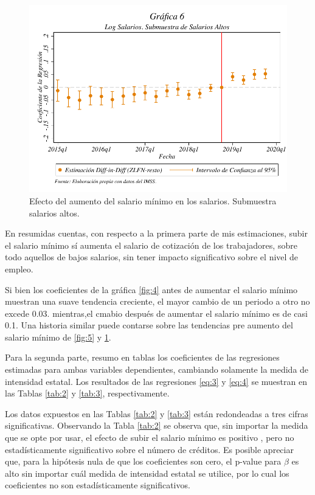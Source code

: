 \begin{figure}[H]
\includegraphics[width=\textwidth]{Figures/_LogSalarios_SalariosAltos.pdf}\caption{Efecto del aumento del salario mínimo en los salarios. Submuestra salarios altos.}
\label{fig:6}
\end{figure}

En resumidas cuentas, con respecto a la primera parte de mis estimaciones, subir el salario mínimo sí aumenta el salario de cotización de los trabajadores, sobre todo aquellos de bajos salarios, sin tener impacto significativo sobre el nivel de empleo. 

Si bien los coeficientes de la gráfica \ref{fig:4} antes de aumentar el salario mínimo muestran una suave tendencia creciente, el mayor cambio de un periodo a otro no excede 0.03. mientras,el cmabio después de aumentar el salario mínimo es de casi 0.1. Una historia similar puede contarse sobre las tendencias pre aumento del salario mínimo de \ref{fig:5} y \ref{fig:6}.

Para la segunda parte, resumo en tablas los coeficientes de las regresiones estimadas para ambas variables dependientes, cambiando solamente la medida de intensidad estatal. Los resultados de las regresiones \ref{eq:3} y \ref{eq:4} se muestran en las Tablas \ref{tab:2} y \ref{tab:3}, respectivamente.


Los datos expuestos en las Tablas \ref{tab:2} y \ref{tab:3} están redondeadas a tres cifras significativas. Observando la Tabla \ref{tab:2} se observa que, sin importar la medida que se opte por usar, el efecto de subir el salario mínimo es positivo , pero no estadísticamente significativo sobre el número de créditos. Es posible apreciar que, para la hipótesis nula de que los coeficientes son cero, el p-value para $\beta$ es alto sin importar cuál medida de intensidad estatal se utilice, por lo cual los coeficientes no son estadísticamente significativos. 

